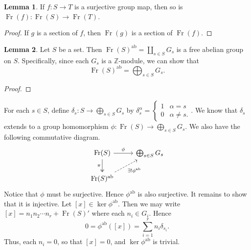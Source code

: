 \documentclass[10pt,letterpaper,cm]{nupset}
\theoremstyle{definition}
\newtheorem{lemma}{Lemma}
\newcommand{\Z}{\mathbb Z}
\newcommand{\1}{\mathbf{1}}
\newcommand{\0}{\vec 0}
\DeclareMathOperator{\ab}{ab}
\DeclareMathOperator{\Fr}{Fr}
\begin{document}
\begin{lemma}
If $f: S \to T$ is a surjective group map, then so is $\Fr(f) : \Fr(S) \to \Fr(T)$.
\end{lemma}
\begin{proof}
If $g$ is a section of $f$, then $\Fr(g)$ is a section of $\Fr(f)$.
\end{proof}

\begin{lemma}
Let $S$ be a set. Then $\Fr(S)^{\ab}= \coprod_{s\in S} G_s$ is a free abelian group on $S$. Specifically, since each $G_s$ is a $\Z$-module, we can show that $$\Fr(S)^{\ab} = \bigoplus_{s\in S} G_s.$$
\end{lemma}
\begin{proof}
\end{proof}
For each $s\in S$, define $\delta_s : S \to \bigoplus_{s\in S} G_s$ by $\delta_s^{\alpha} =  \begin{cases} 1 & \alpha = s \\ 0 & \alpha \ne s . \end{cases}$. We know that $\delta_s$ extends to a group  homomorphism $ \phi : \Fr(S) \to \bigoplus_{s\in S} G_s$. We also have the following commutative diagram.
\[
\begin{tikzcd}
\Fr(S) \arrow[d, "\pi"', two heads] \arrow[r, "\phi"] & \bigoplus_{s\in S} G_s \\
\Fr(S)^{\ab} \arrow[ru, "\exists! \phi^{\ab}"', dashed] & 
\end{tikzcd}
\]
Notice that $\phi$ must be surjective. Hence $\phi^{\ab}$ is also surjective. It remains to show that it is injective. Let $[x] \in \ker \phi^{\ab}$.
Then we may write $[x] = n_1n_2\cdots n_r+\Fr(S)'$ where each $n_i \in G_i$. Hence $$0= \phi^{\ab}([x]) = \sum_{i=1}^r n_i \delta_{s_i}.$$ Thus, each $n_i=0$, so that $[x]=0$, and $\ker \phi^{\ab}$ is trivial. 
\end{document}

